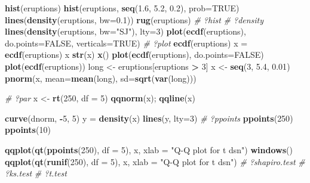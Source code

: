 \documentclass[10pt,]{krantz}
\makeatletter
\newenvironment{Shaded}{\begin{snugshade}}{\end{snugshade}}
\newcommand{\KeywordTok}[1]{\textcolor[rgb]{0.13,0.29,0.53}{\textbf{#1}}}
\newcommand{\DataTypeTok}[1]{\textcolor[rgb]{0.13,0.29,0.53}{#1}}
\newcommand{\DecValTok}[1]{\textcolor[rgb]{0.00,0.00,0.81}{#1}}
\newcommand{\FloatTok}[1]{\textcolor[rgb]{0.00,0.00,0.81}{#1}}
\newcommand{\StringTok}[1]{\textcolor[rgb]{0.31,0.60,0.02}{#1}}
\newcommand{\CommentTok}[1]{\textcolor[rgb]{0.56,0.35,0.01}{\textit{#1}}}
\newcommand{\OtherTok}[1]{\textcolor[rgb]{0.56,0.35,0.01}{#1}}
\newcommand{\OperatorTok}[1]{\textcolor[rgb]{0.81,0.36,0.00}{\textbf{#1}}}
\newcommand{\NormalTok}[1]{#1}
\newenvironment{kframe}{%
\medskip{}
\setlength{\fboxsep}{.8em}
 \def\at@end@of@kframe{}%
 \ifinner\ifhmode%
  \def\at@end@of@kframe{\end{minipage}}%
  \begin{minipage}{\columnwidth}%
 \fi\fi%
 \def\FrameCommand##1{\hskip\@totalleftmargin \hskip-\fboxsep
 \colorbox{shadecolor}{##1}\hskip-\fboxsep
     \hskip-\linewidth \hskip-\@totalleftmargin \hskip\columnwidth}%
 \MakeFramed {\advance\hsize-\width
   \@totalleftmargin\z@ \linewidth\hsize
   \@setminipage}}%
 {\par\unskip\endMakeFramed%
 \at@end@of@kframe}
\renewenvironment{Shaded}{\begin{kframe}}{\end{kframe}}
\theoremstyle{definition}
\theoremstyle{definition}
\theoremstyle{remark}
\makeatother
\begin{document}
\begin{Shaded}
\begin{Highlighting}[]
\KeywordTok{hist}\NormalTok{(eruptions)}
\KeywordTok{hist}\NormalTok{(eruptions, }\KeywordTok{seq}\NormalTok{(}\FloatTok{1.6}\NormalTok{, }\FloatTok{5.2}\NormalTok{, }\FloatTok{0.2}\NormalTok{), }\DataTypeTok{prob=}\OtherTok{TRUE}\NormalTok{)}
\KeywordTok{lines}\NormalTok{(}\KeywordTok{density}\NormalTok{(eruptions, }\DataTypeTok{bw=}\FloatTok{0.1}\NormalTok{))}
\KeywordTok{rug}\NormalTok{(eruptions)}
\CommentTok{# ?hist}
\CommentTok{# ?density}
\KeywordTok{lines}\NormalTok{(}\KeywordTok{density}\NormalTok{(eruptions, }\DataTypeTok{bw=}\StringTok{"SJ"}\NormalTok{), }\DataTypeTok{lty=}\DecValTok{3}\NormalTok{)}
\KeywordTok{plot}\NormalTok{(}\KeywordTok{ecdf}\NormalTok{(eruptions), }\DataTypeTok{do.points=}\OtherTok{FALSE}\NormalTok{, }\DataTypeTok{verticals=}\OtherTok{TRUE}\NormalTok{)}
\CommentTok{# ?plot}
\KeywordTok{ecdf}\NormalTok{(eruptions)}
\NormalTok{x =}\StringTok{ }\KeywordTok{ecdf}\NormalTok{(eruptions)}
\NormalTok{x}
\KeywordTok{str}\NormalTok{(x)}
\KeywordTok{x}\NormalTok{()}
\KeywordTok{plot}\NormalTok{(}\KeywordTok{ecdf}\NormalTok{(eruptions), }\DataTypeTok{do.points=}\OtherTok{FALSE}\NormalTok{)}
\KeywordTok{plot}\NormalTok{(}\KeywordTok{ecdf}\NormalTok{(eruptions))}
\NormalTok{long <-}\StringTok{ }\NormalTok{eruptions[eruptions }\OperatorTok{>}\StringTok{ }\DecValTok{3}\NormalTok{]}
\NormalTok{x <-}\StringTok{ }\KeywordTok{seq}\NormalTok{(}\DecValTok{3}\NormalTok{, }\FloatTok{5.4}\NormalTok{, }\FloatTok{0.01}\NormalTok{)}
\KeywordTok{pnorm}\NormalTok{(x, }\DataTypeTok{mean=}\KeywordTok{mean}\NormalTok{(long), }\DataTypeTok{sd=}\KeywordTok{sqrt}\NormalTok{(}\KeywordTok{var}\NormalTok{(long)))}

\CommentTok{# ?par}
\NormalTok{x <-}\StringTok{ }\KeywordTok{rt}\NormalTok{(}\DecValTok{250}\NormalTok{, }\DataTypeTok{df =} \DecValTok{5}\NormalTok{)}
\KeywordTok{qqnorm}\NormalTok{(x); }\KeywordTok{qqline}\NormalTok{(x)}

\KeywordTok{curve}\NormalTok{(dnorm, }\OperatorTok{-}\DecValTok{5}\NormalTok{, }\DecValTok{5}\NormalTok{)}
\NormalTok{y =}\StringTok{ }\KeywordTok{density}\NormalTok{(x)}
\KeywordTok{lines}\NormalTok{(y, }\DataTypeTok{lty=}\DecValTok{3}\NormalTok{)}
\CommentTok{# ?ppoints}
\KeywordTok{ppoints}\NormalTok{(}\DecValTok{250}\NormalTok{)}
\KeywordTok{ppoints}\NormalTok{(}\DecValTok{10}\NormalTok{)}

\KeywordTok{qqplot}\NormalTok{(}\KeywordTok{qt}\NormalTok{(}\KeywordTok{ppoints}\NormalTok{(}\DecValTok{250}\NormalTok{), }\DataTypeTok{df =} \DecValTok{5}\NormalTok{), x, }\DataTypeTok{xlab =} \StringTok{"Q-Q plot for t dsn"}\NormalTok{)}
\KeywordTok{windows}\NormalTok{()}
\KeywordTok{qqplot}\NormalTok{(}\KeywordTok{qt}\NormalTok{(}\KeywordTok{runif}\NormalTok{(}\DecValTok{250}\NormalTok{), }\DataTypeTok{df =} \DecValTok{5}\NormalTok{), x, }\DataTypeTok{xlab =} \StringTok{"Q-Q plot for t dsn"}\NormalTok{)}
\CommentTok{# ?shapiro.test}
\CommentTok{# ?ks.test}
\CommentTok{# ?t.test}



\end{Highlighting}
\end{Shaded}
\end{document}
